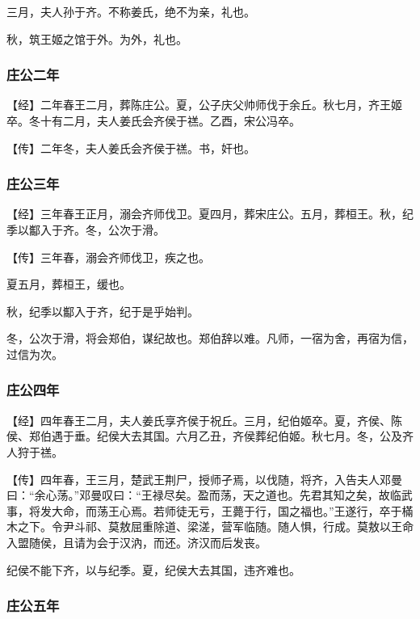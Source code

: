 \documentclass[]{article}
\begin{document}
三月，夫人孙于齐。不称姜氏，绝不为亲，礼也。

秋，筑王姬之馆于外。为外，礼也。

\hypertarget{header-n362}{%
\subsubsection{庄公二年}\label{header-n362}}

【经】二年春王二月，葬陈庄公。夏，公子庆父帅师伐于余丘。秋七月，齐王姬卒。冬十有二月，夫人姜氏会齐侯于禚。乙酉，宋公冯卒。

【传】二年冬，夫人姜氏会齐侯于禚。书，奸也。

\hypertarget{header-n367}{%
\subsubsection{庄公三年}\label{header-n367}}

【经】三年春王正月，溺会齐师伐卫。夏四月，葬宋庄公。五月，葬桓王。秋，纪季以酅入于齐。冬，公次于滑。

【传】三年春，溺会齐师伐卫，疾之也。

夏五月，葬桓王，缓也。

秋，纪季以酅入于齐，纪于是乎始判。

冬，公次于滑，将会郑伯，谋纪故也。郑伯辞以难。凡师，一宿为舍，再宿为信，过信为次。

\hypertarget{header-n375}{%
\subsubsection{庄公四年}\label{header-n375}}

【经】四年春王二月，夫人姜氏享齐侯于祝丘。三月，纪伯姬卒。夏，齐侯、陈侯、郑伯遇于垂。纪侯大去其国。六月乙丑，齐侯葬纪伯姬。秋七月。冬，公及齐人狩于禚。

【传】四年春，王三月，楚武王荆尸，授师孑焉，以伐随，将齐，入告夫人邓曼曰：``余心荡。''邓曼叹曰：``王禄尽矣。盈而荡，天之道也。先君其知之矣，故临武事，将发大命，而荡王心焉。若师徒无亏，王薨于行，国之福也。''王遂行，卒于樠木之下。令尹斗祁、莫敖屈重除道、梁溠，营军临随。随人惧，行成。莫敖以王命入盟随侯，且请为会于汉汭，而还。济汉而后发丧。

纪侯不能下齐，以与纪季。夏，纪侯大去其国，违齐难也。

\hypertarget{header-n381}{%
\subsubsection{庄公五年}\label{header-n381}}
\end{document}
